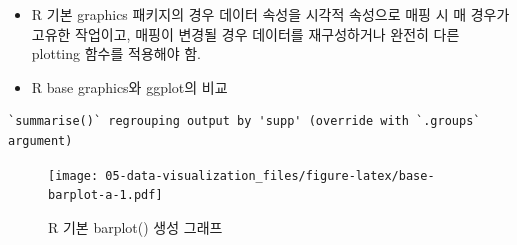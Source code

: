 \documentclass[
  11pt,
]{krantz}
\newenvironment{Shaded}{\begin{snugshade}}{\end{snugshade}}
\newcommand{\CommentTok}[1]{\textcolor[rgb]{0.37,0.37,0.37}{\textit{#1}}}
\newcommand{\DataTypeTok}[1]{\textcolor[rgb]{0.27,0.27,0.27}{#1}}
\newcommand{\KeywordTok}[1]{\textcolor[rgb]{0.27,0.27,0.27}{\textbf{#1}}}
\newcommand{\NormalTok}[1]{#1}
\newcommand{\OperatorTok}[1]{\textcolor[rgb]{0.43,0.43,0.43}{\textbf{#1}}}
\newcommand{\OtherTok}[1]{\textcolor[rgb]{0.37,0.37,0.37}{#1}}
\newcommand{\StringTok}[1]{\textcolor[rgb]{0.5,0.5,0.5}{#1}}
\providecommand{\tightlist}{%
  \setlength{\itemsep}{0pt}\setlength{\parskip}{0pt}}
\begin{document}
\normalsize

\begin{itemize}
\tightlist
\item
  R 기본 graphics 패키지의 경우 데이터 속성을 시각적 속성으로 매핑 시 매 경우가 고유한 작업이고, 매핑이 변경될 경우 데이터를 재구성하거나 완전히 다른 plotting 함수를 적용해야 함.
\item
  R base graphics와 ggplot의 비교
\end{itemize}

\footnotesize

\begin{Shaded}
\end{Shaded}

\begin{verbatim}
`summarise()` regrouping output by 'supp' (override with `.groups` argument)
\end{verbatim}

\begin{Shaded}
\end{Shaded}

\begin{figure}
\centering
\texttt{[image: 05-data-visualization\_files/figure-latex/base-barplot-a-1.pdf]}
\caption{\label{fig:base-barplot-a}R 기본 barplot() 생성 그래프}
\end{figure}
\end{document}
